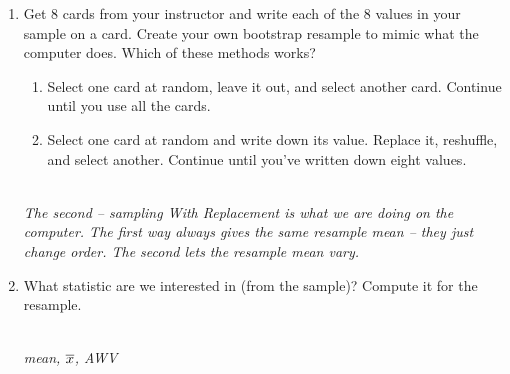 \begin{enumerate}
\begin{enumerate}
    \item Get 8 cards from your instructor and write each of the 8 values in
      your sample on a card.  Create your own bootstrap resample to
      mimic what the computer does.  Which of these methods works?
      \begin{enumerate}
      \item Select one card at random, leave it out, and select
        another card.  Continue until you use all the cards.
      \item Select one card at random and write down its
        value. Replace it, reshuffle, and select another.  Continue
        until you've written down eight  values. 
      \end{enumerate}
\begin{students}
        \vspace{2cm}        
\end{students}
\begin{key}
\ \  \\
  {\it The second -- sampling With Replacement is what we are doing
    on the computer. The first way always gives the same resample
    mean -- they just change order. The second lets the resample mean vary.}
\end{key}

\item What statistic are we interested in (from the sample)?  Compute
  it for the resample. 
\begin{students}
        \vspace{1cm}        
\end{students}
\begin{key}
  \\{\it mean, $\overline{x}$, AWV}
\end{key}


\end{enumerate}
\end{enumerate}
